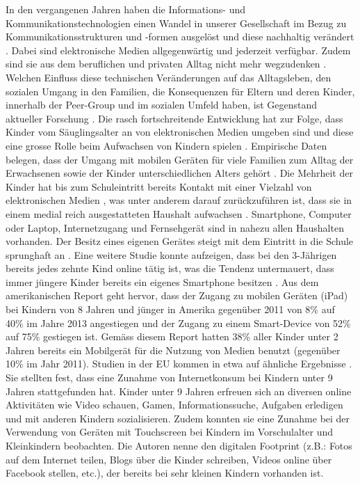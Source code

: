In den vergangenen Jahren haben die Informations- und Kommunikationstechnologien einen Wandel in unserer Gesellschaft im Bezug zu Kommunikationsstrukturen und -formen ausgelöst und diese nachhaltig verändert \cite{Hasebrink2009, Bms2013}. Dabei sind elektronische Medien allgegenwärtig und jederzeit verfügbar. Zudem sind sie aus dem beruflichen und privaten Alltag nicht mehr wegzudenken \cite{Bmfsfj2013}. Welchen Einfluss diese technischen Veränderungen auf das Alltagsleben, den sozialen Umgang in den Familien, die Konsequenzen für Eltern und deren Kinder, innerhalb der Peer-Group und im sozialen Umfeld haben, ist Gegenstand aktueller Forschung \cite{Olafsson2014}. Die rasch fortschreitende Entwicklung hat zur Folge, dass Kinder vom Säuglingsalter an von elektronischen Medien umgeben sind und diese eine grosse Rolle beim Aufwachsen von Kindern spielen \cite{Feierabend2015, Divsi2015}. Empirische Daten belegen, dass der Umgang mit mobilen Geräten für viele Familien zum Alltag der Erwachsenen sowie der Kinder unterschiedlichen Alters gehört \cite{Wagner2016}. Die Mehrheit der Kinder hat bis zum Schuleintritt bereits Kontakt mit einer Vielzahl von elektronischen Medien \cite{Feierabend2015}, was unter anderem darauf zurückzuführen ist, dass sie in einem medial reich ausgestatteten Haushalt aufwachsen \cite{Suter2015}. Smartphone, Computer oder Laptop, Internetzugang und Fernsehgerät sind in nahezu allen Haushalten vorhanden. Der Besitz eines eigenen Gerätes steigt mit dem Eintritt in die Schule sprunghaft an \cite{Feierabend2015a}. Eine weitere Studie konnte aufzeigen, dass bei den 3-Jährigen bereits jedes zehnte Kind online tätig ist, was die Tendenz untermauert, dass immer jüngere Kinder bereits ein eigenes Smartphone besitzen \cite{Divsi2015}. Aus dem amerikanischen Report  geht hervor, dass der Zugang zu mobilen Geräten (iPad) bei Kindern von 8 Jahren und jünger in Amerika gegenüber 2011 von 8\% auf 40\% im Jahre 2013 angestiegen und der Zugang zu einem Smart-Device von 52\% auf 75\% gestiegen ist. Gemäss diesem Report hatten 38\% aller Kinder unter 2 Jahren bereits ein Mobilgerät für die Nutzung von Medien benutzt (gegenüber 10\% im Jahr 2011). Studien in der EU kommen in etwa auf ähnliche Ergebnisse \cite{Holloway2013}. Sie stellten fest, dass eine Zunahme von Internetkonsum bei Kindern unter 9 Jahren stattgefunden hat. Kinder unter 9 Jahren erfreuen sich an diversen online Aktivitäten wie Video schauen, Gamen, Informationssuche, Aufgaben erledigen 
und mit anderen Kindern sozialisieren. Zudem konnten sie eine Zunahme bei der Verwendung von Geräten mit Touchscreen bei Kindern im Vorschulalter und Kleinkindern beobachten. Die Autoren nenne den digitalen Footprint (z.B.: Fotos auf dem Internet teilen, Blogs über die Kinder schreiben, Videos online über Facebook stellen, etc.), der bereits bei sehr kleinen Kindern vorhanden ist.

